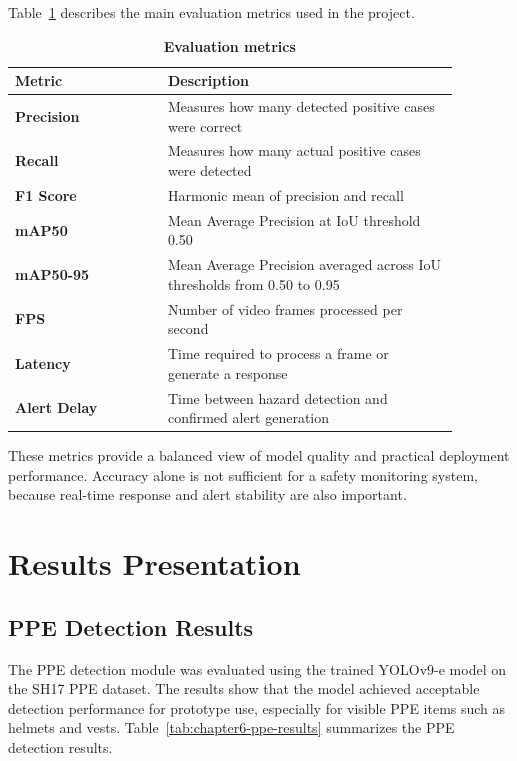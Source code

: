 Table~\ref{tab:chapter6-evaluation-metrics} describes the main evaluation metrics used in the project.

\begin{table}[H]
\centering
\renewcommand{\arraystretch}{1.55}
\begin{tabular}{|>{\centering\arraybackslash}p{0.3\linewidth}|>{\centering\arraybackslash}p{0.58\linewidth}|}
\hline
\textbf{Metric} & \textbf{Description} \\
\hline
\textbf{Precision} & Measures how many detected positive cases were correct \\
\hline
\textbf{Recall} & Measures how many actual positive cases were detected \\
\hline
\textbf{F1 Score} & Harmonic mean of precision and recall \\
\hline
\textbf{mAP50} & Mean Average Precision at IoU threshold 0.50 \\
\hline
\textbf{mAP50-95} & Mean Average Precision averaged across IoU thresholds from 0.50 to 0.95 \\
\hline
\textbf{FPS} & Number of video frames processed per second \\
\hline
\textbf{Latency} & Time required to process a frame or generate a response \\
\hline
\textbf{Alert Delay} & Time between hazard detection and confirmed alert generation \\
\hline
\end{tabular}
\caption{\textbf{Evaluation metrics}}
\label{tab:chapter6-evaluation-metrics}
\end{table}

These metrics provide a balanced view of model quality and practical deployment performance. Accuracy alone is not sufficient for a safety monitoring system, because real-time response and alert stability are also important.

\section{Results Presentation}

\subsection{PPE Detection Results}

The PPE detection module was evaluated using the trained YOLOv9-e model on the SH17 PPE dataset. The results show that the model achieved acceptable detection performance for prototype use, especially for visible PPE items such as helmets and vests. Table~\ref{tab:chapter6-ppe-results} summarizes the PPE detection results.

